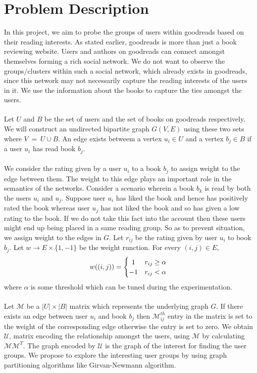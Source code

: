 \documentclass[12pt]{article}
\begin{document}
\section{Problem Description}
In this project, we aim to probe the groups of users within goodreads based on their reading interests. As stated earlier, goodreads is more than just a book reviewing website. Users and authors on goodreads can connect amongst themselves forming a rich social network. We do not want to observe the groups/clusters within such a social network, which already exists in goodreads, since this network may not necessarily capture the reading interests of the users in it. We use the information about the books to capture the ties amongst the users. \\\\
Let $U$ and $B$ be the set of users and the set of books on goodreads respectively. We will construct an undirected bipartite graph $G(V, E)$ using these two sets where $V ~=~ U \cup B$. An edge exists betweem a vertex $u_i \in U$ and a vertex $b_j \in B$ if a user $u_i$ has read book $b_j$.\\\\
We consider the rating given by a user $u_i$ to a book $b_j$ to assign weight to the edge between them. The weight to this edge plays an important role in the semantics of the networks. Consider a scenario wherein a book $b_k$ is read by both the users $u_i$ and $u_j$. Suppose user $u_i$ has liked the book and hence has positively rated the book whereas user $u_j$ has not liked the book and so has given a low rating to the book. If we do not take this fact into the account then these users might end up being placed in a same reading group. So as to prevent situation, we assign weight to the edges in $G$. Let $r_{ij}$ be the rating given by user $u_i$ to book $b_j$. Let $w \rightarrow E \times \{1, -1\}$ be the weight runction. For every $(i, j) \in E$, 
\[
	w((i, j)) = \left\{\def\arraystretch{1.2}%
		\begin{array}{@{}c@{\quad}l@{}}
		1 & r_{ij} \geq \alpha\\
		-1 & r_{ij} < \alpha\\
		\end{array}\right.
\]
where $\alpha$ is some threshold which can be tuned during the experimentation.
\\\\
Let $\mathcal{M}$ be a $|U| \times |B|$ matrix which represents the underlying graph $G$. If there exists an edge between user $u_i$ and book $b_j$ then $\mathcal{M}_{ij}^{th}$ entry in the matrix is set to the weight of the corresponding edge otherwise the entry is set to zero. We obtain $\mathcal{U}$, matrix encoding the relationship amongst the users, using $\mathcal{M}$ by calculating $\mathcal{M}\mathcal{M}^{T}$. The graph encoded by $\mathcal{U}$ is the graph of the interest for finding the user groups. We propose to explore the interesting user groups by using graph partitioning algorithms like Girvan-Newmann algorithm.
\end{document}
